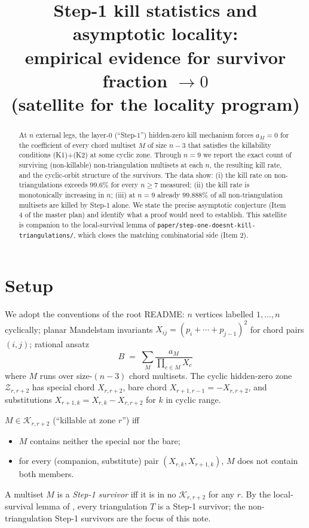 \documentclass[11pt]{article}
\title{Step-1 kill statistics and asymptotic locality:\\
       \large empirical evidence for survivor fraction $\to 0$\\
       \small{(satellite for the locality program)}}
\date{}
\theoremstyle{definition}
\begin{document}
\maketitle

\begin{abstract}
At $n$ external legs, the layer-$0$ (``Step-1'') hidden-zero kill mechanism
forces $a_M = 0$ for the coefficient of every chord multiset $M$ of size
$n-3$ that satisfies the killability conditions (K1)+(K2) at some cyclic
zone. Through $n=9$ we report the exact count of surviving (non-killable)
non-triangulation multisets at each $n$, the resulting kill rate, and the
cyclic-orbit structure of the survivors. The data show: (i) the kill rate
on non-triangulations exceeds $99.6\%$ for every $n \ge 7$ measured;
(ii) the kill rate is monotonically increasing in $n$; (iii) at $n=9$
already $99.888\%$ of all non-triangulation multisets are killed by
Step-1 alone. We state the precise asymptotic conjecture (Item 4 of the
master plan) and identify what a proof would need to establish.
This satellite is companion to the local-survival lemma of
\verb|paper/step-one-doesnt-kill-triangulations/|, which closes the
matching combinatorial side (Item 2).
\end{abstract}

\section{Setup}

We adopt the conventions of the root README: $n$ vertices labelled
$1, \dots, n$ cyclically; planar Mandelstam invariants
$X_{ij} = (p_i + \cdots + p_{j-1})^2$ for chord pairs $(i, j)$; rational
ansatz
\[
   B \;=\; \sum_M \frac{a_M}{\prod_{c \in M} X_c}
\]
where $M$ runs over size-$(n-3)$ chord multisets. The cyclic
hidden-zero zone $\mathcal Z_{r, r+2}$ has special chord
$X_{r,r+2}$, bare chord $X_{r+1,r-1} = -X_{r,r+2}$, and substitutions
$X_{r+1, k} = X_{r,k} - X_{r,r+2}$ for $k$ in cyclic range.

$M \in \mathcal K_{r,r+2}$ (``killable at zone $r$'') iff
\begin{itemize}[leftmargin=*,topsep=0pt,itemsep=2pt]
\item[\rm (K1)] $M$ contains neither the special nor the bare;
\item[\rm (K2)] for every (companion, substitute) pair $(X_{r,k}, X_{r+1,k})$,
$M$ does not contain both members.
\end{itemize}
A multiset $M$ is a \emph{Step-1 survivor} iff it is in no
$\mathcal K_{r, r+2}$ for any $r$. By the local-survival lemma of
\cite{tri-survives}, every triangulation $T$ is a Step-1 survivor; the
non-triangulation Step-1 survivors are the focus of this note.
\end{document}
